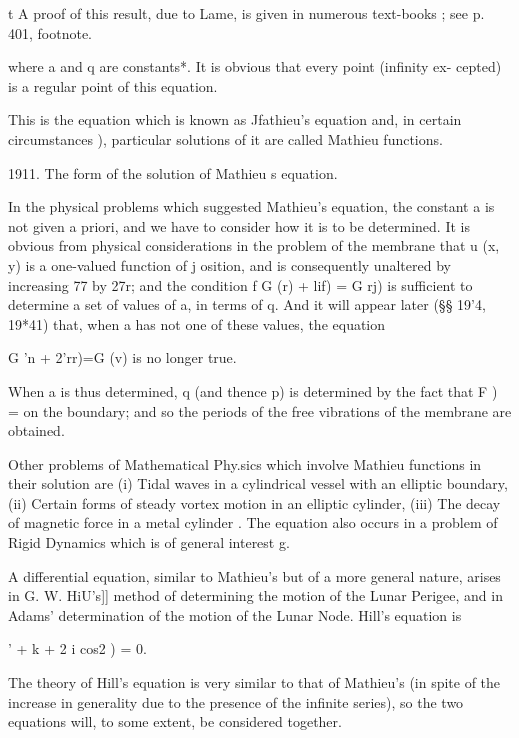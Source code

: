 t A proof of this result, due to Lame, is given in numerous text-books
; see p. 401, footnote.

%
%

where a and q are constants*. It is obvious that every point (infinity
ex- cepted) is a regular point of this equation.

This is the equation which is known as Jfathieu's equation and, in
certain circumstances ), particular solutions of it are called
Mathieu functions.

1911. The form of the solution of Mathieu s equation.

In the physical problems which suggested Mathieu's equation, the
constant a is not given a priori, and we have to consider how it is to
be determined. It is obvious from physical considerations in the
problem of the membrane that u (x, y) is a one-valued function of j
osition, and is consequently unaltered by increasing 77 by 27r; and
the condition f G (r) + lif) = G rj) is sufficient to determine a set
of values of a, in terms of q. And it will appear later (§§ 19'4,
19*41) that, when a has not one of these values, the equation

G 'n + 2'rr)=G (v) is no longer true.

When a is thus determined, q (and thence p) is determined by the fact
that F ) = on the boundary; and so the periods of the free vibrations
of the membrane are obtained.

Other problems of Mathematical Phy.sics which involve Mathieu
functions in their solution are (i) Tidal waves in a cylindrical
vessel with an elliptic boundary, (ii) Certain forms of steady vortex
motion in an elliptic cylinder, (iii) The decay of magnetic force in a
metal cylinder . The equation also occurs in a problem of Rigid
Dynamics which is of general interest g.


A differential equation, similar to Mathieu's but of a more general
nature, arises in G. W. HiU's]] method of determining the motion of
the Lunar Perigee, and in Adams' determination of the motion of the
Lunar Node. Hill's equation is

 ' + k + 2 i cos2 ) = 0.

The theory of Hill's equation is very similar to that of Mathieu's (in
spite of the increase in generality due to the presence of the
infinite series), so the two equations will, to some extent, be
considered together.

